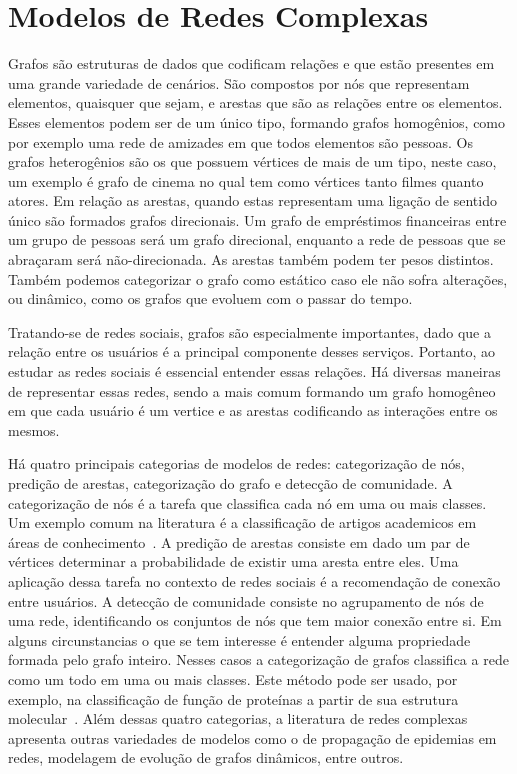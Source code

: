 \chapter{Modelos de Redes Complexas}
\label{chapter:networks}

Grafos são estruturas de dados que codificam relações e que estão presentes em
uma grande variedade de cenários.
São compostos por nós que representam elementos, quaisquer que sejam, e arestas
que são as relações entre os elementos.
Esses elementos podem ser de um único tipo, formando grafos homogênios, como por
exemplo uma rede de amizades em que todos elementos são pessoas.
Os grafos heterogênios são os que possuem vértices de mais de um tipo, neste
caso, um exemplo é grafo de cinema no qual tem como vértices tanto filmes quanto
atores.
Em relação as arestas, quando estas representam uma ligação de sentido único são
formados grafos direcionais.
Um grafo de empréstimos financeiras entre um grupo de pessoas será um grafo
direcional, enquanto a rede de pessoas que se abraçaram será não-direcionada.
As arestas também podem ter pesos distintos.
Também podemos categorizar o grafo como estático caso ele não sofra alterações,
ou dinâmico, como os grafos que evoluem com o passar do tempo.

Tratando-se de redes sociais, grafos são especialmente importantes, dado que
a relação entre os usuários é a principal componente desses serviços.
Portanto, ao estudar as redes sociais é essencial entender essas relações.
Há diversas maneiras de representar essas redes, sendo a mais comum formando um
grafo homogêneo em que cada usuário é um vertice e as arestas codificando as
interações entre os mesmos.

Há quatro principais categorias de modelos de redes: categorização de nós, predição
de arestas, categorização do grafo e detecção de comunidade.
A categorização de nós é a tarefa que classifica cada nó em uma ou mais classes.
Um exemplo comum na literatura é a classificação de artigos academicos em áreas
de conhecimento~\cite{sen08}.
A predição de arestas consiste em dado um par de vértices determinar a
probabilidade de existir uma aresta entre eles. Uma aplicação dessa tarefa no
contexto de redes sociais é a recomendação de conexão entre usuários.
A detecção de comunidade consiste no agrupamento de nós de uma rede,
identificando os conjuntos de nós que tem maior conexão entre si.
Em alguns circunstancias o que se tem interesse é entender alguma propriedade
formada pelo grafo inteiro.
Nesses casos a categorização de grafos classifica a rede como um todo em uma ou
mais classes.
Este método pode ser usado, por exemplo, na classificação de função de
proteínas a partir de sua estrutura molecular~\cite{shervashidze11}.
Além dessas quatro categorias, a literatura de redes complexas apresenta outras
variedades de modelos como o de propagação de epidemias em redes, modelagem de
evolução de grafos dinâmicos, entre outros.

